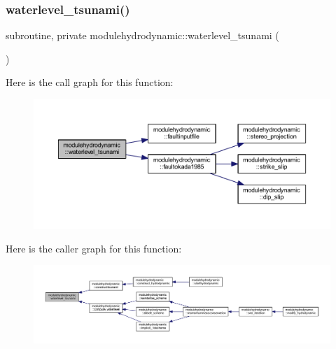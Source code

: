 \subsubsection{\texorpdfstring{waterlevel\+\_\+tsunami()}{waterlevel\_tsunami()}}
{\footnotesize\ttfamily subroutine, private modulehydrodynamic\+::waterlevel\+\_\+tsunami (\begin{DoxyParamCaption}{ }\end{DoxyParamCaption})\hspace{0.3cm}{\ttfamily [private]}}

Here is the call graph for this function\+:\nopagebreak
\begin{figure}[H]
\begin{center}
\leavevmode
\includegraphics[width=350pt]{namespacemodulehydrodynamic_af4cd55d170e7b64149a737b5bbe9951c_cgraph}
\end{center}
\end{figure}
Here is the caller graph for this function\+:\nopagebreak
\begin{figure}[H]
\begin{center}
\leavevmode
\includegraphics[width=350pt]{namespacemodulehydrodynamic_af4cd55d170e7b64149a737b5bbe9951c_icgraph}
\end{center}
\end{figure}
\mbox{\label{namespacemodulehydrodynamic_a592aa79c419a6f5815c5df5a4b4548a9}} 
